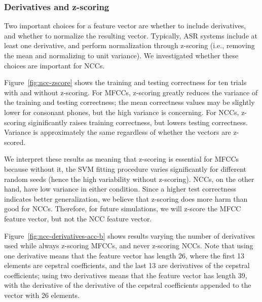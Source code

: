 \subsubsection{Derivatives and z-scoring}

Two important choices for a feature vector
are whether to include derivatives,
and whether to normalize the resulting vector.
Typically, ASR systems include at least
one derivative, and perform normalization
through z-scoring
(i.e., removing the mean
and normalizing to unit variance).
We investigated whether these
choices are important for NCCs.


Figure~\ref{fig:ncc-zscore} shows
the training and testing correctness
for ten trials
with and without z-scoring.
For MFCCs,
z-scoring greatly reduces the variance
of the training and testing correctness;
the mean correctness values
may be slightly lower
for consonant phones,
but the high variance is concerning.
For NCCs,
z-scoring siginificantly
raises training correctness,
but lowers testing correctness.
Variance is approximately the same
regardless of whether the vectors are z-scored.

We interpret these results
as meaning that z-scoring is essential
for MFCCs because without it,
the SVM fitting procedure
varies significantly for
different random seeds
(hence the high variability without z-scoring).
NCCs, on the other hand,
have low variance in either condition.
Since a higher test correctness indicates
better generalization,
we believe that z-scoring
does more harm than good for NCCs.
Therefore, for future simulations,
we will z-score the MFCC feature vector,
but not the NCC feature vector.


Figure~\ref{fig:ncc-derivatives-acc-b} shows
results varying the number of derivatives
used while always z-scoring MFCCs,
and never z-scoring NCCs.
Note that using one derivative means
that the feature vector has
length 26,
where the first 13 elements
are cepstral coefficients,
and the last 13 are derivatives
of the cepstral coefficients;
using two derivatives means that
the feature vector has length 39,
with the derivative of the
derivative of the cepstral coefficients
appended to the vector with 26 elements.

